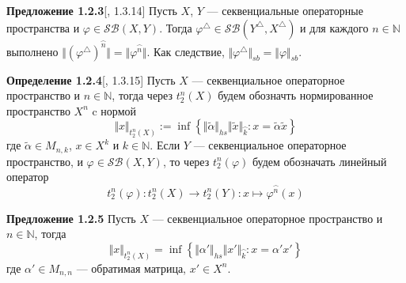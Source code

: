 \documentclass[12pt]{article}
\begin{document}
{\bf Предложение 1.2.3}[\cite{LamOpFolgen}, 1.3.14]\label{PrDualSBOp}
Пусть $X$, $Y$ --- секвенциальные операторные пространства и $\varphi\in \mathcal{SB}(X,Y)$. Тогда $\varphi^\triangle \in\mathcal{SB}(Y^\triangle ,X^\triangle )$ и для каждого  $n\in\mathbb{N}$ выполнено 
$\Vert(\varphi^\triangle )^{\wideparen{n}}\Vert=\Vert\varphi^{\wideparen{n}}\Vert$. Как следствие, $\Vert\varphi^\triangle \Vert_{sb}=\Vert\varphi\Vert_{sb}$.

\medskip

{\bf Определение 1.2.4}[\cite{LamOpFolgen}, 1.3.15]\label{DefT2n}
Пусть $X$ --- секвенциальное операторное пространство и $n\in\mathbb{N}$, тогда через $t_2^n(X)$ будем обозначть нормированное пространство $X^n$ c нормой
$$
\Vert x\Vert_{t_2^n(X)}:=\inf\left\{\Vert\tilde{\alpha}\Vert_{hs}\Vert \tilde{x}\Vert_{\wideparen{k}}:x=\tilde{\alpha} \tilde{x}\right\}
$$
где $\tilde{\alpha}\in M_{n,k}$, $x\in X^k$ и $k\in\mathbb{N}$. Если $Y$ --- секвенциальное операторное пространство, и $\varphi\in\mathcal{SB}(X,Y)$, то через $t_2^n(\varphi)$ будем обозначать линейный оператор
$$
t_2^n(\varphi): t_2^n(X)\to t_2^n(Y): x\mapsto \varphi^{\wideparen{n}}(x)
$$

\medskip

{\bf Предложение 1.2.5}\label{PrT2nNormProperty}
Пусть $X$ --- секвенциальное операторное пространство и $n\in\mathbb{N}$, тогда
$$
\Vert x\Vert_{t_2^n(X)}=\inf\left\{\Vert\alpha'\Vert_{hs}\Vert x'\Vert_{\wideparen{k}}:x=\alpha'x'\right\}
$$
где $\alpha'\in M_{n,n}$ --- обратимая матрица, $x'\in X^{n}$.
\end{document}
